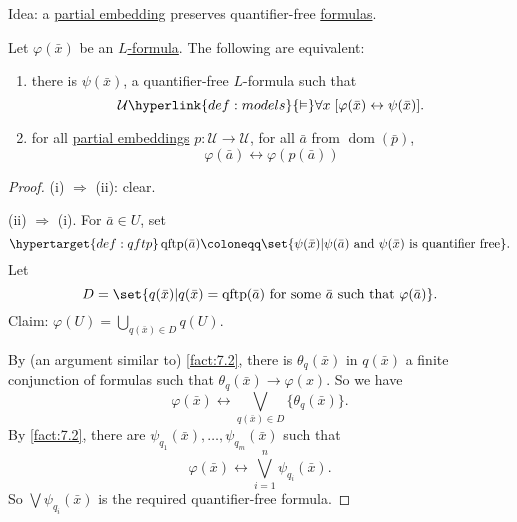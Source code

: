 \documentclass{article}
\let\models\vDash
\DeclareMathOperator{\dom}{dom}
\DeclareMathOperator{\qftp}{qftp}
\newcommand{\named}[1]{\textbf{#1}\index{#1}}
\begin{document}
Idea: a \hyperlink{def:upe}{partial embedding} preserves quantifier-free \hyperlink{def:form}{formulas}.
\begin{nprop}\label{prop:7.7}
  Let $\varphi(\bar{x})$ be an \hyperlink{def:form}{$L$-formula}. The following are equivalent:
  \begin{enumerate}[label=(\roman*)]
    \item there is $\psi(\bar{x})$, a quantifier-free $L$-formula such that
      \begin{equation*}
        \mathcal{U} \hyperlink{def:models}{\models} \forall x\; [\varphi(\bar{x}) \leftrightarrow \psi(\bar{x})].
      \end{equation*}
    \item for all \hyperlink{def:upe}{partial embeddings} $p: \mathcal{U} \to \mathcal{U}$, for all $\bar{a}$ from $\dom(\bar{p})$,
      \begin{equation*}
        \varphi(\bar{a}) \leftrightarrow \varphi(p(\bar{a}))
      \end{equation*}
  \end{enumerate}
\end{nprop}
\begin{proof}
  (i) $\Rightarrow$ (ii): clear.

  (ii) $\Rightarrow$ (i). For $\bar{a} \in U$, set
  \begin{equation*}
    \hypertarget{def:qftp}\qftp(\bar{a}) \coloneqq \set{\psi(\bar{x}) | \psi(\bar{a}) \text{ and } \psi(\bar{x}) \text{ is quantifier free}}. %
  \end{equation*}
  Let
  \begin{equation*}
  D = \set{q(\bar{x}) | q(\bar{x}) = \qftp(\bar{a}) \text{ for some }\bar{a} \text{ such that } \varphi(\bar{a})}.
  \end{equation*}
  Claim: $\varphi(U) = \bigcup_{q(\bar{x}) \in D} q(U)$.

  By (an argument similar to) \cref{fact:7.2}, there is $\theta_q(\bar{x})$ in $q(\bar{x})$ a finite conjunction of formulas such that $\theta_q(\bar{x}) \to \varphi(x)$.
  So we have
  \begin{equation*}
    \varphi(\bar{x}) \leftrightarrow \bigvee_{q(\bar{x}) \in D} \{\theta_q(\bar{x})\}.
  \end{equation*}
  By \cref{fact:7.2}, there are $\psi_{q_1}(\bar{x}), \dotsc, \psi_{q_m}(\bar{x})$ such that
  \begin{equation*}
    \varphi(\bar{x}) \leftrightarrow \bigvee_{i=1}^n \psi_{q_i}(\bar{x}).
  \end{equation*}
  So $\bigvee \psi_{q_i}(\bar{x})$ is the required quantifier-free formula.
\end{proof}
\end{document}
